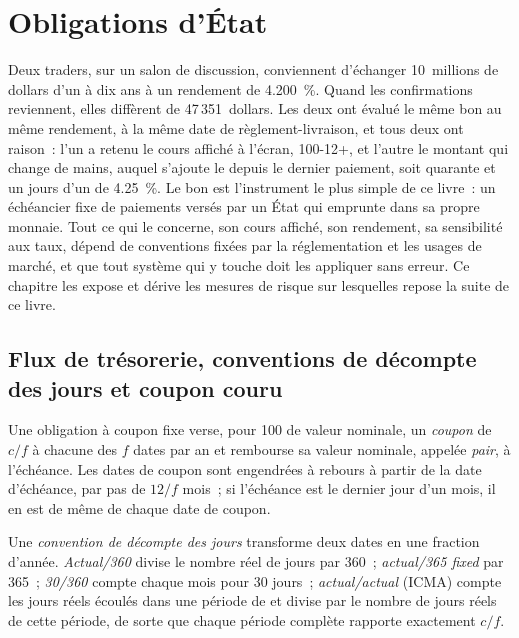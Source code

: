 \chapter{Obligations d'État}\label{ch:m2:government-bonds}

Deux traders, sur un salon de discussion, conviennent d'échanger 10~millions de dollars d'un  à dix ans à un
rendement de 4.200~\%. Quand les confirmations reviennent, elles diffèrent de 47\,351~dollars. Les deux ont
évalué le même bon au même rendement, à la même date de règlement-livraison, et tous deux
ont raison~: l'un a retenu le cours affiché à l'écran, 100-12+, et l'autre
le montant qui change de mains, auquel s'ajoute le  depuis le
dernier paiement, soit quarante et un jours d'un  de 4.25~\%. Le bon est l'instrument le plus
simple de ce livre~: un échéancier fixe de paiements versés par un État qui
emprunte dans sa propre monnaie. Tout ce qui le concerne, son cours affiché, son
rendement, sa sensibilité aux taux, dépend de conventions fixées par
la réglementation et les usages de marché, et que tout système qui y touche doit
les appliquer sans erreur. Ce chapitre les expose et dérive les mesures de risque sur
lesquelles repose la suite de ce livre.

\section{Flux de trésorerie, conventions de décompte des jours et coupon couru}

\begin{definition}\label{def:m2:government-bonds:coupon}
Une obligation à coupon fixe verse, pour 100 de valeur nominale, un \emph{coupon}
de $c/f$ à chacune des $f$ dates par an et rembourse sa valeur nominale, appelée
\emph{pair}, à l'échéance. Les dates de coupon sont engendrées à rebours
à partir de la date d'échéance, par pas de $12/f$ mois~; si l'échéance est le dernier
jour d'un mois, il en est de même de chaque date de coupon.
\end{definition}

\begin{definition}\label{def:m2:government-bonds:daycount}
Une \emph{convention de décompte des jours} transforme deux dates en
une fraction d'année. \emph{Actual/360} divise le nombre réel de jours par
360~; \emph{actual/365 fixed} par 365~; \emph{30/360} compte chaque mois pour 30
jours~; \emph{actual/actual} (ICMA) compte les jours réels écoulés dans une période de 
et divise par le nombre de jours réels de cette période, de sorte que chaque période complète
rapporte exactement $c/f$.
\end{definition}

